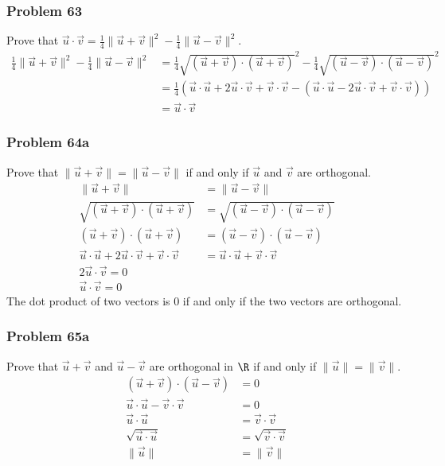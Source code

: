 \documentclass[letterpaper, 12pt]{math}
\begin{document}
\subsubsection*{Problem 63}
Prove that \( \vec{u}\cdot\vec{v} = \frac{1}{4}\|\vec{u}+\vec{v}\|^2-
\frac{1}{4}\|\vec{u}-\vec{v}\|^2 \).
\begin{align*}
  \frac{1}{4}\|\vec{u}+\vec{v}\|^2-\frac{1}{4}\|\vec{u}-\vec{v}\|^2 &=
    \frac{1}{4}\sqrt{(\vec{u}+\vec{v})\cdot(\vec{u}+\vec{v})}^2-
    \frac{1}{4}\sqrt{(\vec{u}-\vec{v})\cdot(\vec{u}-\vec{v})}^2 \\
  &= \frac{1}{4}(\vec{u}\cdot\vec{u}+2\vec{u}\cdot\vec{v}+\vec{v}\cdot\vec{v}-
    (\vec{u}\cdot\vec{u}-2\vec{u}\cdot\vec{v}+\vec{v}\cdot\vec{v})) \\
  &= \vec{u}\cdot\vec{v}
\end{align*}

\subsubsection*{Problem 64a}
Prove that \( \|\vec{u}+\vec{v}\| = \|\vec{u}-\vec{v}\| \) if and only if
\( \vec{u} \) and \( \vec{v} \) are orthogonal.
\begin{align*}
  \|\vec{u}+\vec{v}\| &= \|\vec{u}-\vec{v}\| \\
  \sqrt{(\vec{u}+\vec{v})\cdot(\vec{u}+\vec{v})} &=
    \sqrt{(\vec{u}-\vec{v})\cdot(\vec{u}-\vec{v})} \\
  (\vec{u}+\vec{v})\cdot(\vec{u}+\vec{v}) &=
    (\vec{u}-\vec{v})\cdot(\vec{u}-\vec{v}) \\
  \vec{u}\cdot\vec{u}+2\vec{u}\cdot\vec{v}+\vec{v}\cdot\vec{v} &=
    \vec{u}\cdot\vec{u}+\vec{v}\cdot\vec{v} \\
  2\vec{u}\cdot\vec{v} = 0 \\
  \vec{u}\cdot\vec{v} = 0
\end{align*}
The dot product of two vectors is 0 if and only if the two vectors are
orthogonal.

\subsubsection*{Problem 65a}
Prove that \( \vec{u}+\vec{v} \) and \( \vec{u}-\vec{v} \) are orthogonal in
\( \R \) if and only if \( \|\vec{u}\| = \|\vec{v}\| \).
\begin{align*}
  (\vec{u}+\vec{v})\cdot(\vec{u}-\vec{v}) &= 0 \\
  \vec{u}\cdot\vec{u}-\vec{v}\cdot\vec{v} &= 0 \\
  \vec{u}\cdot\vec{u} &= \vec{v}\cdot\vec{v} \\
  \sqrt{\vec{u}\cdot\vec{u}} &= \sqrt{\vec{v}\cdot\vec{v}} \\
  \|\vec{u}\| &= \|\vec{v}\|
\end{align*}
\end{document}

